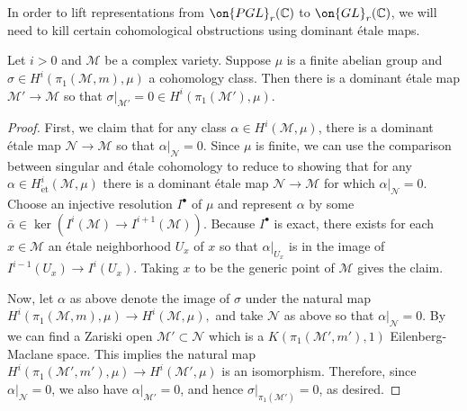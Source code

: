 In order to lift representations from
$\on{PGL}_r(\mathbb C)$ to
$\on{GL}_r(\mathbb C)$,
we will need to kill certain cohomological obstructions using dominant \'etale maps.
\begin{lemma}
\notready
	\label{lemma:vanish-on-etale}
	Let $i > 0$ and $\mathscr{M}$ be a complex variety. Suppose $\mu$ is a finite abelian group and
	$\sigma \in H^i(\pi_1(\mathscr M, m), \mu)$
	a cohomology class.
	Then there is a dominant \'etale map $\mathscr M' \to \mathscr M$
	so that $\sigma|_{\mathscr M'} =0 \in H^i(\pi_1(\mathscr M'), \mu)$.
\end{lemma}
\begin{proof}
%

First, we claim that for any class
$\alpha \in H^i(\mathscr M, \mu)$,
there is a dominant \'etale map $\mathscr N \to \mathscr M$ so that
$\alpha|_{\mathscr N} = 0$.
Since $\mu$ is finite, we can use the comparison between singular
and \'etale cohomology to reduce to showing that for any
$\alpha \in H^i_{\mathrm{\acute et}}(\mathscr M, \mu)$ there is a dominant \'etale map
$\mathscr N \to \mathscr M$ for which $\alpha|_{\mathscr N}= 0$.
Choose an injective resolution $I^\bullet$ of $\mu$ and represent
$\alpha$ by some $\bar\alpha \in \ker(I^i(\mathscr M) \to I^{i+1}(\mathscr M))$.
Because $I^\bullet$ is exact, there exists for each $x\in \mathscr{M}$ an \'etale neighborhood $U_x$ of $x$
so that $\alpha|_{U_x}$ is in the image of $I^{i-1}(U_x)\to I^{i}(U_x)$. Taking $x$ to be the generic point of $\mathscr{M}$ gives the claim.

Now, let $\alpha$ as above denote the image of $\sigma$ under the natural map
$H^i(\pi_1(\mathscr M, m), \mu) \to H^i(\mathscr M, \mu),$
and take $\mathscr N$ as above so that $\alpha|_\mathscr N = 0$.
By
\cite[Expos\'e XI, 4.6]{SGA4}
we can find a Zariski open $\mathscr M'
\subset \mathscr N$ which is a
$K(\pi_1(\mathscr M', m'), 1)$ Eilenberg-Maclane space.
This implies the natural map $H^i(\pi_1(\mathscr M', m'), \mu) \to H^i(\mathscr M', \mu)$
is an isomorphism.
Therefore, since $\alpha|_{\mathscr N} = 0$, we also have $\alpha|_{\mathscr M'}
= 0$, and hence $\sigma|_{\pi_1(\mathscr M')} = 0$, as desired.
\end{proof}

